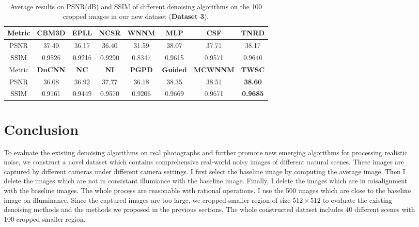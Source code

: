\begin{table}[hbp]
\caption{Average results on PSNR(dB) and SSIM of different denoising algorithms on the 100 cropped images in our new dataset (\textbf{Dataset 3}).}
\scriptsize
\label{tab6-8}
\begin{center}
\renewcommand\arraystretch{1.2}
\begin{tabular*}{1\textwidth}{@{\extracolsep{\fill}}cccccccc}
\hline
Metric
&
\textbf{CBM3D}
&
\textbf{EPLL}
&
\textbf{NCSR}
&
\textbf{WNNM}
&
\textbf{MLP}
&
\textbf{CSF}
&
\textbf{TNRD}
\\
\hline
PSNR & 37.40 & 36.17 & 36.40 & 31.59 & 38.07 & 37.71 & 38.17 
\\
\hline
SSIM & 0.9526 & 0.9216 & 0.9290 & 0.8347 & 0.9615 & 0.9571 & 0.9640
\\
\hline
Metric
&
\textbf{DnCNN}
&
\textbf{NC}
&
\textbf{NI}
&
\textbf{PGPD}
&
\textbf{Guided}
&
\textbf{MCWNNM}
&
\textbf{TWSC}
\\
\hline
PSNR & 36.08 & 36.92  &  37.77 & 36.18 & 38.35 & 38.51 & \textbf{38.60}
\\
\hline
SSIM & 0.9161 & 0.9449  & 0.9570  & 0.9206 & 0.9669 & 0.9671 & \textbf{0.9685}
\\
\hline
\end{tabular*}
\end{center}
\end{table}




\section{Conclusion}

To evaluate the existing denoising algorithms on real photographs and further promote new emerging algorithms for processing realistic noise, we construct a novel dataset which contains comprehensive real-world noisy images of different natural scenes. These images are captured by different cameras under different camera settings. I first select the baseline image by computing the average image. Then I delete the images which are not in consistant illumiance with the baseline image. Finally, I delete the images which are in misalignment with the baseline images. The whole process are reasonable with rational operations. I use the 500 images which are close to the baseline image on illuminance. Since the captured images are too large, we cropped smaller region of size $512\times512$ to evaluate the existing denoising methods and the methods we proposed in the previous sections. The whole constructed dataset includes 40 different scenes with 100 cropped smaller region.


